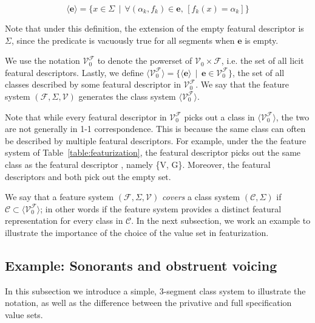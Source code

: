 \documentclass[11pt, oneside]{article}   	%
\begin{document}
$$ \big \langle \mathbf{e} \big \rangle = \{x \in \Sigma \, \mid \, \forall (\alpha_k, f_k) \in \mathbf{e} \text{,  } [ f_k(x) = \alpha_k ] \} $$

\vspace{\baselineskip} \noindent Note that under this definition, the extension of the empty featural descriptor is $\Sigma$, since the predicate is vacuously true for all segments when $\mathbf{e}$ is empty. 

We use the notation $\mathcal V_0^\mathcal F$ to denote the powerset of $\mathcal V_0 \times \mathcal F$, i.e. the set of all licit featural descriptors. Lastly, we define $\langle \mathcal V_0^\mathcal F \rangle = \{ \langle \mathbf{e} \rangle \, \mid \, \mathbf{e} \in \mathcal V_0^\mathcal F \}$, the set of all classes described by some featural descriptor in $\mathcal V_0^\mathcal F$. We say that the feature system $(\mathcal F, \Sigma, \mathcal V)$ generates the class system $\langle \mathcal V_0^\mathcal F \rangle$.

Note that while every featural descriptor in $\mathcal V_0^\mathcal F$ picks out a class in $\langle \mathcal V_0^\mathcal F \rangle$, the two are not generally in 1-1 correspondence. This is because the same class can often be described by multiple featural descriptors. For example, under the the feature system of Table~\ref{table:featurization}, the featural descriptor  picks out the same class as the featural descriptor , namely \{V, G\}. Moreover, the featural descriptors  and  both pick out the empty set.

\vspace{\baselineskip} We say that a feature system $(\mathcal F, \Sigma, \mathcal V)$ \textit{covers} a class system $(\mathcal C, \Sigma)$ if $\mathcal C \subset \langle \mathcal V_0^\mathcal F \rangle$; in other words if the feature system provides a distinct featural representation for every class in $\mathcal C$. In the next subsection, we work an example to illustrate the importance of the choice of the value set in featurization.

\subsection{Example: Sonorants and obstruent voicing}

In this subsection we introduce a simple, 3-segment class system to illustrate the notation, as well as the difference between the privative and full specification value sets.
\end{document}
